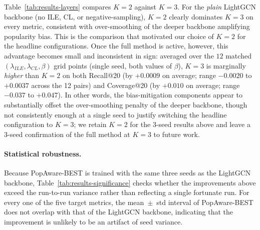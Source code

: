 Table~\ref{tab:results-layers} compares $K=2$ against $K=3$. For the \emph{plain} LightGCN
backbone (no ILE, CL, or negative-sampling), $K=2$ clearly dominates $K=3$ on every metric,
consistent with over-smoothing of the deeper backbone amplifying popularity bias. This is the
comparison that motivated our choice of $K=2$ for the headline configurations. Once the full
method is active, however, this advantage becomes small and inconsistent in sign: averaged
over the $12$ matched $(\lambda_{ILE},\lambda_{CL},\beta)$ grid points (single seed, both
values of $\beta$), $K=3$ is marginally \emph{higher} than $K=2$ on both Recall@20 (by
$+0.0009$ on average; range $-0.0020$ to $+0.0037$ across the 12 pairs) and Coverage@20 (by
$+0.010$ on average; range $-0.037$ to $+0.047$). In other words, the bias-mitigation
components appear to substantially offset the over-smoothing penalty of the deeper backbone,
though not consistently enough at a single seed to justify switching the headline
configuration to $K=3$; we retain $K=2$ for the 3-seed results above and leave a 3-seed
confirmation of the full method at $K=3$ to future work.

\begin{table}[t]
\centering
\footnotesize
\caption{Effect of the number of propagation layers $K$ on the \emph{plain} LightGCN
backbone (single seed; no ILE, CL, or negative-sampling).}
\label{tab:results-layers}
\end{table}

\paragraph{Statistical robustness.}
Because PopAware-BEST is trained with the same three seeds as the LightGCN backbone,
Table~\ref{tab:results-significance} checks whether the improvements above exceed the
run-to-run variance rather than reflecting a single fortunate run. For every one of the five
target metrics, the mean~$\pm$~std interval of PopAware-BEST does not overlap with that of the
LightGCN backbone, indicating that the improvement is unlikely to be an artifact of seed
variance.

